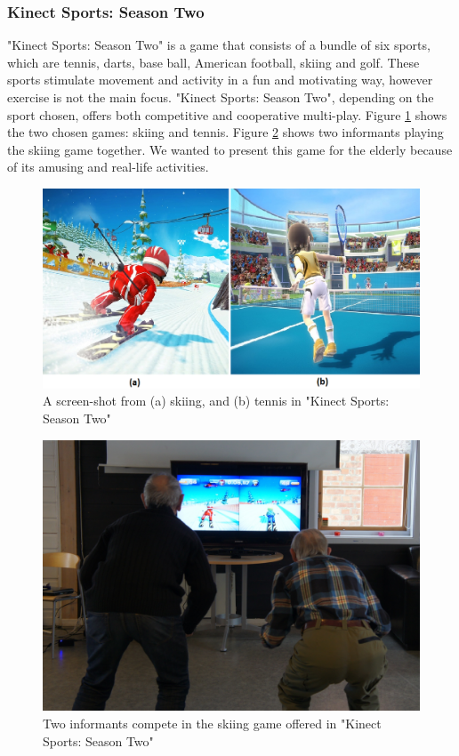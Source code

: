 \subsubsection{Kinect Sports: Season Two}
"Kinect Sports: Season Two" is a game that consists of a bundle of six sports, which are tennis, darts, base ball, American football, skiing and golf. These sports stimulate movement and activity in a fun and motivating way, however exercise is not the main focus. "Kinect Sports: Season Two", depending on the sport chosen, offers both competitive and cooperative multi-play. Figure \ref{fig:sportsgame} shows the two chosen games: skiing and tennis. Figure \ref{fig:elderlyskii} shows two informants playing the skiing game together. We wanted to present this game for the elderly because of its amusing and real-life activities. 

\begin{figure} [H]
\centering
\includegraphics[scale=0.4]{skiitennis}
\caption[Kinect Sports: Season Two, Skiing and Tennis]{A screen-shot from (a) skiing, and (b) tennis in "Kinect Sports: Season Two" \cite{sportsgame}}
\label{fig:sportsgame}
\end{figure}

\begin{figure}
\centering
\includegraphics[scale=0.5]{eldreSpiller.jpg}
\caption[Kinect Sports: Season Two, Multi-play]{Two informants compete in the skiing game offered in "Kinect Sports: Season Two"}
\label{fig:elderlyskii}
\end{figure}

